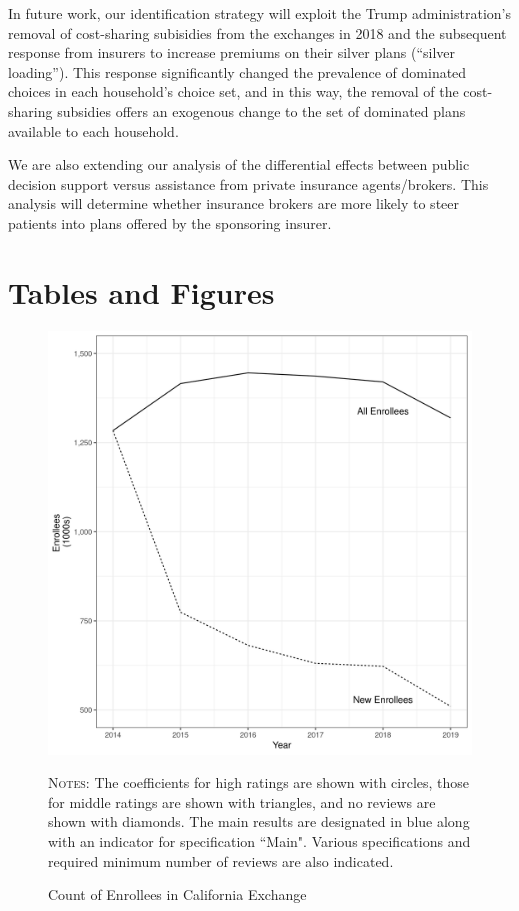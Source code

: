 \documentclass[12pt]{article}
\begin{document}
In future work, our identification strategy will exploit the Trump administration's removal of cost-sharing subisidies from the exchanges in 2018 and the subsequent response from insurers to increase premiums on their silver plans (``silver loading''). This response significantly changed the prevalence of dominated choices in each household's choice set, and in this way, the removal of the cost-sharing subsidies offers an exogenous change to the set of dominated plans available to each household.

We are also extending our analysis of the differential effects between public decision support versus assistance from private insurance agents/brokers. This analysis will determine whether insurance brokers are more likely to steer patients into plans offered by the sponsoring insurer.

\pagebreak



\clearpage
\newpage


\section*{Tables and Figures}

\begin{figure}[htb]\caption{Count of Enrollees in California Exchange}
\centering
 		\hspace*{-1cm}\includegraphics[scale=.7]{figures/enrollee_count.png}
 		\begin{minipage}{\textwidth}
		\bigskip
			\footnotesize \textsc{Notes:} The coefficients for high ratings are shown with circles, those for middle ratings are shown with triangles, and no reviews are shown with diamonds. The main results are designated in blue along with an indicator for specification ``Main". Various specifications and required minimum number of reviews are also indicated. 
 		\end{minipage}
 		\label{figure:SpecCurve}
 \end{figure}
\end{document}

